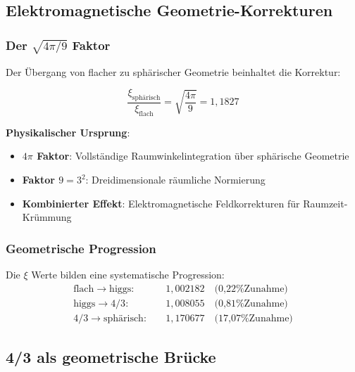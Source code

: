 \documentclass[12pt,a4paper]{article}
\newcommand{\xipar}{\ensuremath{\xi}}
\newcommand{\mypi}{\ensuremath{\pi}}
\newcommand{\myrightarrow}{\ensuremath{\rightarrow}}
\begin{document}
	\subsection{Elektromagnetische Geometrie-Korrekturen}
	\label{subsec:em_korrekturen}
	
	\subsubsection{Der $\sqrt{4\mypi/9}$ Faktor}
	\label{subsubsec:korrekturfaktor}
	
	Der Übergang von flacher zu sphärischer Geometrie beinhaltet die Korrektur:
	
	\begin{equation}
		\frac{\xipar_{\text{sphärisch}}}{\xipar_{\text{flach}}} = \sqrt{\frac{4\mypi}{9}} = 1,1827
		\label{eq:em_korrektur}
	\end{equation}
	
	\textbf{Physikalischer Ursprung}:
	\begin{itemize}
		\item \textbf{$4\mypi$ Faktor}: Vollständige Raumwinkelintegration über sphärische Geometrie
		\item \textbf{Faktor $9 = 3^2$}: Dreidimensionale räumliche Normierung
		\item \textbf{Kombinierter Effekt}: Elektromagnetische Feldkorrekturen für Raumzeit-Krümmung
	\end{itemize}
	
	\subsubsection{Geometrische Progression}
	\label{subsubsec:geometrische_progression}
	
	Die $\xi$ Werte bilden eine systematische Progression:
	\begin{align}
		\text{flach} \myrightarrow \text{higgs}: \quad &1,002182 \quad \text{(0,22\% Zunahme)} \\
		\text{higgs} \myrightarrow \text{4/3}: \quad &1,008055 \quad \text{(0,81\% Zunahme)} \\
		\text{4/3} \myrightarrow \text{sphärisch}: \quad &1,170677 \quad \text{(17,07\% Zunahme)}
	\end{align}
	
	\subsection{4/3 als geometrische Brücke}
	\label{subsec:vier_drittel_bruecke}
	
\end{document}
